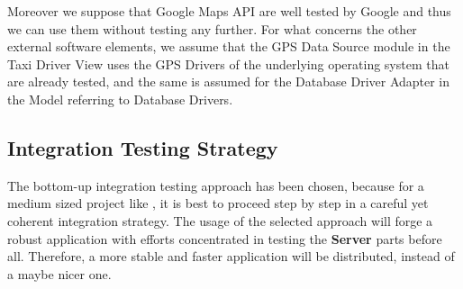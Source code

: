 Moreover we suppose that Google Maps API are well tested by Google and thus we can use them without testing any further.
For what concerns the other external software elements, we assume that the GPS Data Source module in the Taxi Driver View uses the GPS Drivers of the underlying operating system that are already tested, and the same is assumed for the Database Driver Adapter in the Model referring to Database Drivers.
%
\subsection{Integration Testing Strategy}
The bottom-up integration testing approach has been chosen, because for a medium sized project like \myTaxiService{}, it is best to proceed step by step in a careful yet coherent integration strategy.
The usage of the selected approach will forge a robust application with efforts concentrated in testing the \textbf{Server} parts before all.
Therefore, a more stable and faster application will be distributed, instead of a maybe nicer one.
%
